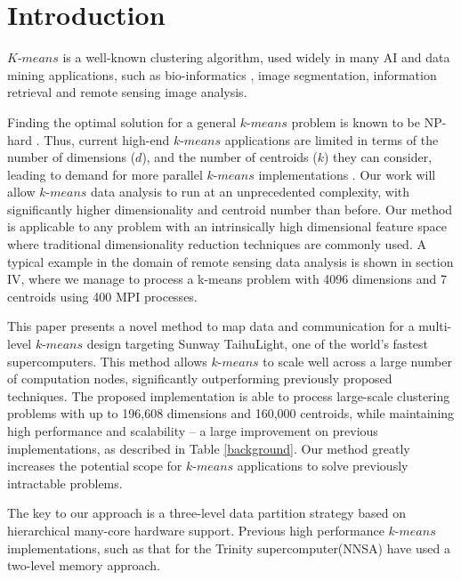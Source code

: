 \section{Introduction}

$K$-$means$ is a well-known clustering algorithm, used widely in many AI and data mining applications, such as bio-informatics \cite{ben1999clustering, jiang2004cluster}, image segmentation\cite{coleman1979image, jain1988algorithms}, information retrieval \cite{steinbach2000comparison} and remote sensing image analysis\cite{kumar2011parallel}.

Finding the optimal solution for a general $k$-$means$ problem is known to be NP-hard \cite{dasgupta2008hardness}. Thus, current high-end $k$-$means$ applications are limited in terms of the number of dimensions ($d$), and the number of centroids ($k$) they can consider, leading to demand for more parallel $k$-$means$ implementations \cite{kumar2011parallel,bender2015k}. Our work will allow $k$-$means$ data analysis to run at an unprecedented complexity, with significantly higher dimensionality and centroid number than before. Our method is applicable to any problem with an intrinsically high dimensional feature space where traditional dimensionality reduction techniques are commonly used.
A typical example in the domain of remote sensing data analysis is shown in section IV, where we manage to process a k-means problem with 4096 dimensions and 7 centroids using 400 MPI processes.

This paper presents a novel method to map data and communication for a multi-level $k$-$means$ design targeting Sunway TaihuLight, one of the world's fastest supercomputers. This method allows $k$-$means$ to scale well across a large number of computation nodes, significantly outperforming previously proposed techniques. The proposed implementation is able to  process large-scale clustering problems with up to 196,608 dimensions and 160,000  centroids, while maintaining high performance and scalability -- a large improvement on previous implementations, as described in Table \ref{background}.  Our method greatly increases the potential scope for $k$-$means$ applications to solve previously intractable problems.

The key to our approach is a three-level data partition strategy based on hierarchical many-core hardware support. Previous high performance $k$-$means$ implementations, such as that for the Trinity supercomputer(NNSA)\cite{bender2015k} have used a two-level memory approach. 

